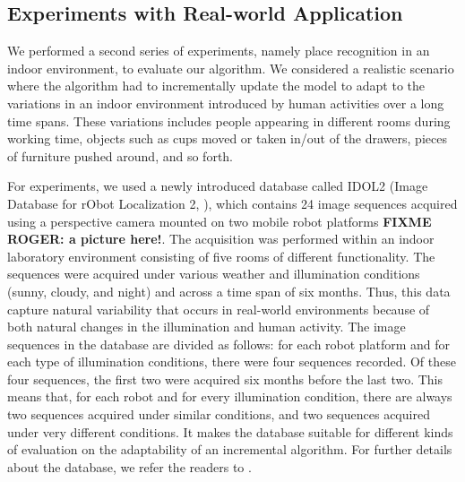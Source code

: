 \subsection{Experiments with Real-world Application}
\label{exp:idol2}

We performed a second series of experiments, namely place recognition in 
an indoor environment, to evaluate our algorithm. 
We considered a realistic scenario where the algorithm had to 
incrementally update the
model to adapt to the variations in an indoor environment 
introduced by human activities
over a long time spans. These variations includes people appearing 
in different rooms during
working time, objects such as cups moved or taken in/out of the drawers, 
pieces of
furniture pushed around, and so forth.   

For experiments, we used a newly introduced database called IDOL2 
(Image Database
for rObot Localization 2, \cite{luo:idol2}), which contains 24 image 
sequences acquired
using a perspective camera mounted on two mobile robot platforms
\textbf{FIXME ROGER: a picture here!}. 
The acquisition was
performed within an indoor laboratory environment consisting of five 
rooms of different
functionality. The sequences were acquired under various weather and 
illumination conditions
(sunny, cloudy, and night) and across a time span of six months. 
Thus, this data capture
natural variability that occurs in real-world environments because of both 
natural changes
in the illumination and human activity. The image sequences in the 
database are divided as
follows: for each robot platform and for each type of illumination conditions, 
there were
four sequences recorded. Of these four sequences, the first two were 
acquired six months
before the last two. This means that, for each robot and for every 
illumination condition,
there are always two sequences acquired under similar conditions, and two 
sequences acquired
under very different conditions. It makes the database suitable for 
different kinds of
evaluation on the adaptability of an incremental algorithm. 
For further details about the
database, we refer the readers to \cite{luo:idol2}.

